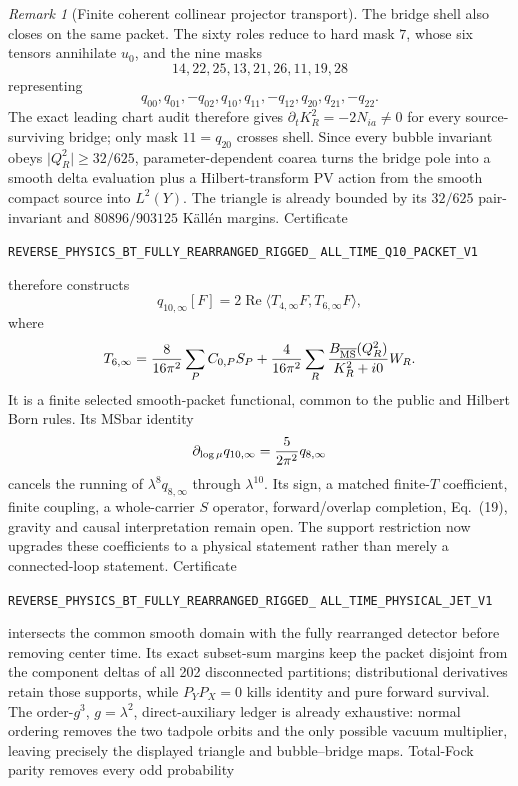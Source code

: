 \documentclass[11pt]{article}
\theoremstyle{definition}
\theoremstyle{remark}
\newtheorem{remark}[theorem]{Remark}
\begin{document}
\begin{remark}[Finite coherent collinear projector transport]
The bridge shell also closes on the same packet.  The sixty roles reduce to
hard mask \(7\), whose six tensors annihilate \(u_0\), and the nine masks
\[
 14,22,25,13,21,26,11,19,28
\]
representing
\[
 q_{00},q_{01},-q_{02},q_{10},q_{11},-q_{12},
 q_{20},q_{21},-q_{22}.
\]
The exact leading chart audit therefore gives
\(\partial_tK_R^2=-2N_{ia}\ne0\) for every source-surviving bridge; only
mask \(11=q_{20}\) crosses shell.  Since every bubble invariant obeys
\(\lvert Q_R^2\rvert\ge32/625\), parameter-dependent coarea turns the bridge
pole into a smooth delta evaluation plus a Hilbert-transform PV action from
the smooth compact source into \(L^2(Y)\).  The triangle is already bounded
by its \(32/625\) pair-invariant and \(80896/903125\) Källén margins.
Certificate
\par\noindent
\texttt{REVERSE\_PHYSICS\_BT\_FULLY\_REARRANGED\_RIGGED\_}
\allowbreak\texttt{ALL\_TIME\_Q10\_PACKET\_V1}
\par\noindent
therefore constructs
\[
 \boxed{q_{10,\infty}[F]
 =2\operatorname{Re}\langle
 T_{4,\infty}F,T_{6,\infty}F\rangle},
\]
where
\[
 T_{6,\infty}
 ={8\over16\pi^2}\sum_PC_{0,P}S_P
 +{4\over16\pi^2}\sum_R
 {B_{\overline{\rm MS}}(Q_R^2)\over K_R^2+i0}W_R.
\]
It is a finite selected smooth-packet functional, common to the public and
Hilbert Born rules.  Its MSbar identity
\[
 \partial_{\log\mu}q_{10,\infty}
 ={5\over2\pi^2}q_{8,\infty}
\]
cancels the running of \(\lambda^8q_{8,\infty}\) through
\(\lambda^{10}\).  Its sign, a matched finite-\(T\) coefficient, finite
coupling, a whole-carrier \(S\) operator, forward/overlap completion,
Eq.~(19), gravity and causal interpretation remain open.
The support restriction now upgrades these coefficients to a physical
statement rather than merely a connected-loop statement.  Certificate
\par\noindent
\texttt{REVERSE\_PHYSICS\_BT\_FULLY\_REARRANGED\_RIGGED\_}
\allowbreak\texttt{ALL\_TIME\_PHYSICAL\_JET\_V1}
\par\noindent
intersects the common smooth domain with the fully rearranged detector before
removing center time.  Its exact subset-sum margins keep the packet disjoint
from the component deltas of all 202 disconnected partitions; distributional
derivatives retain those supports, while $P_YP_X=0$ kills identity and pure
forward survival.  The order-$g^3$, $g=\lambda^2$, direct-auxiliary ledger is
already exhaustive: normal ordering removes the two tadpole orbits and the
only possible vacuum multiplier, leaving precisely the displayed triangle
and bubble--bridge maps.  Total-Fock parity removes every odd probability

\end{remark}
\end{document}
